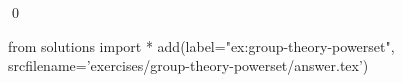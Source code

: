 
\begin{ex} 
  \label{ex:group-theory-powerset}
  
  \qed
\end{ex} 
\begin{python0}
from solutions import *
add(label="ex:group-theory-powerset",
    srcfilename='exercises/group-theory-powerset/answer.tex') 
\end{python0}
